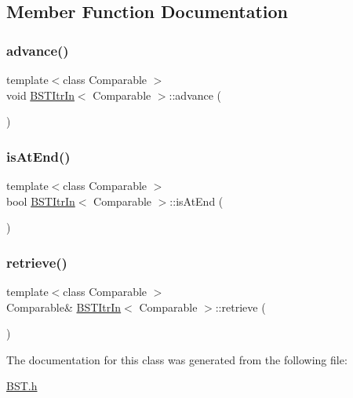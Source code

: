 \subsection{Member Function Documentation}
\mbox{\label{class_b_s_t_itr_in_ac772d3ebbac748c5f8cf9bc659f2e32c}} 
\subsubsection{\texorpdfstring{advance()}{advance()}}
{\footnotesize\ttfamily template$<$class Comparable $>$ \\
void \hyperlink{class_b_s_t_itr_in}{B\+S\+T\+Itr\+In}$<$ Comparable $>$\+::advance (\begin{DoxyParamCaption}{ }\end{DoxyParamCaption})}

\mbox{\label{class_b_s_t_itr_in_a6f9a43217862c263a9bf15b9a08b889a}} 
\subsubsection{\texorpdfstring{is\+At\+End()}{isAtEnd()}}
{\footnotesize\ttfamily template$<$class Comparable $>$ \\
bool \hyperlink{class_b_s_t_itr_in}{B\+S\+T\+Itr\+In}$<$ Comparable $>$\+::is\+At\+End (\begin{DoxyParamCaption}{ }\end{DoxyParamCaption})\hspace{0.3cm}{\ttfamily [inline]}}

\mbox{\label{class_b_s_t_itr_in_ac7ac215c1247bd25fc1fdb8053826a32}} 
\subsubsection{\texorpdfstring{retrieve()}{retrieve()}}
{\footnotesize\ttfamily template$<$class Comparable $>$ \\
Comparable\& \hyperlink{class_b_s_t_itr_in}{B\+S\+T\+Itr\+In}$<$ Comparable $>$\+::retrieve (\begin{DoxyParamCaption}{ }\end{DoxyParamCaption})\hspace{0.3cm}{\ttfamily [inline]}}



The documentation for this class was generated from the following file\+:\begin{DoxyCompactItemize}
\item 
\hyperlink{_b_s_t_8h}{B\+S\+T.\+h}\end{DoxyCompactItemize}
